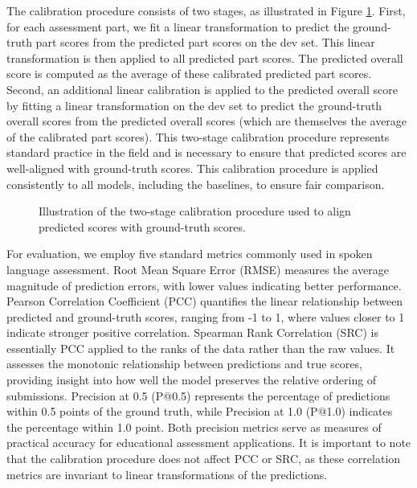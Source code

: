 \documentclass{report}
\begin{document}
The calibration procedure consists of two stages, as illustrated in Figure \ref{fig:calibration_procedure}. First, for each assessment part, we fit a linear transformation to predict the ground-truth part scores from the predicted part scores on the dev set. This linear transformation is then applied to all predicted part scores. The predicted overall score is computed as the average of these calibrated predicted part scores. Second, an additional linear calibration is applied to the predicted overall score by fitting a linear transformation on the dev set to predict the ground-truth overall scores from the predicted overall scores (which are themselves the average of the calibrated part scores). This two-stage calibration procedure represents standard practice in the field \citep{qian2024sandi, ma2025assessment} and is necessary to ensure that predicted scores are well-aligned with ground-truth scores. This calibration procedure is applied consistently to all models, including the baselines, to ensure fair comparison.

\begin{figure}[h]
  \centering
  \caption{Illustration of the two-stage calibration procedure used to align predicted scores with ground-truth scores.}
  \label{fig:calibration_procedure}
\end{figure}

For evaluation, we employ five standard metrics commonly used in spoken language assessment. Root Mean Square Error (RMSE) measures the average magnitude of prediction errors, with lower values indicating better performance. Pearson Correlation Coefficient (PCC) quantifies the linear relationship between predicted and ground-truth scores, ranging from -1 to 1, where values closer to 1 indicate stronger positive correlation. Spearman Rank Correlation (SRC) is essentially PCC applied to the ranks of the data rather than the raw values. It assesses the monotonic relationship between predictions and true scores, providing insight into how well the model preserves the relative ordering of submissions. Precision at 0.5 (P@0.5) represents the percentage of predictions within 0.5 points of the ground truth, while Precision at 1.0 (P@1.0) indicates the percentage within 1.0 point. Both precision metrics serve as measures of practical accuracy for educational assessment applications. It is important to note that the calibration procedure does not affect PCC or SRC, as these correlation metrics are invariant to linear transformations of the predictions.
\end{document}
